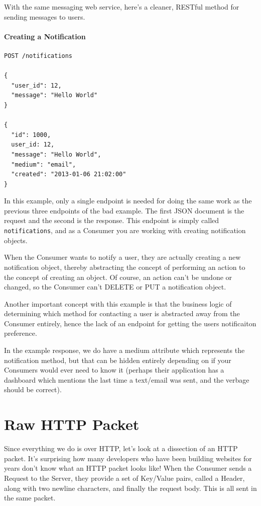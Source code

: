 \documentclass{book}
\begin{document}
With the same messaging web service, here's a cleaner, RESTful method for sending messages to users.

\subsubsection{Creating a Notification}

\begin{verbatim}
POST /notifications

{
  "user_id": 12,
  "message": "Hello World"
}

{
  "id": 1000,
  user_id: 12,
  "message": "Hello World",
  "medium": "email",
  "created": "2013-01-06 21:02:00"
}
\end{verbatim}

In this example, only a single endpoint is needed for doing the same work as the previous three endpoints of the bad example. The first JSON document is the request and the second is the response. This endpoint is simply called \texttt{notifications}, and as a Consumer you are working with creating notification objects.

When the Consumer wants to notify a user, they are actually creating a new notification object, thereby abstracting the concept of performing an action to the concept of creating an object. Of course, an action can't be undone or changed, so the Consumer can't DELETE or PUT a notification object.

Another important concept with this example is that the business logic of determining which method for contacting a user is abstracted away from the Consumer entirely, hence the lack of an endpoint for getting the users notificaiton preference.

In the example response, we do have a medium attribute which represents the notification method, but that can be hidden entirely depending on if your Consumers would ever need to know it (perhaps their application has a dashboard which mentions the last time a text/email was sent, and the verbage should be correct).

\chapter{Raw HTTP Packet}

Since everything we do is over HTTP, let's look at a dissection of an HTTP packet. It's surprising how many developers who have been building websites for years don't know what an HTTP packet looks like! When the Consumer sends a Request to the Server, they provide a set of Key/Value pairs, called a Header, along with two newline characters, and finally the request body. This is all sent in the same packet.
\end{document}
